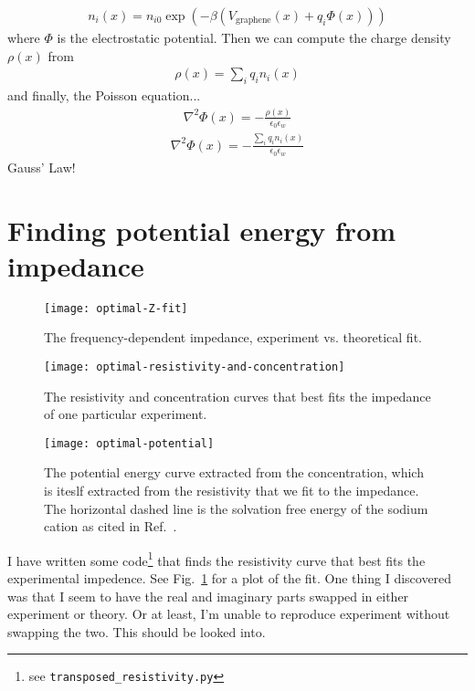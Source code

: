 \documentclass[twocolumn]{revtex4-1}
\begin{document}
\begin{align}
  n_i(x) = n_{i0} \exp\left(-\beta \left(V_{\text{graphene}}(x)
                                       + q_i \Phi(x)\right)\right)
\end{align}
where $\Phi$ is the electrostatic potential.  Then we can compute the
charge density $\rho(x)$ from
\begin{align}
  \rho(x) = \sum_i q_i n_i(x)
\end{align}
and finally, the Poisson equation...
\begin{align}
  \nabla^2 \Phi(x) = -\frac{\rho(x)}{\epsilon_0\epsilon_w}
\end{align}
\begin{align}
  \nabla^2 \Phi(x) = -\frac{\sum_i q_i n_i(x)}{\epsilon_0\epsilon_w}
\end{align}
Gauss' Law!


\clearpage

\section{Finding potential energy from impedance}

\begin{figure}
  \texttt{[image: optimal-Z-fit]}
  \caption{The frequency-dependent impedance, experiment
    vs. theoretical fit.}\label{fig:optimal-Z-fit}
\end{figure}

\begin{figure}
  \texttt{[image: optimal-resistivity-and-concentration]}
  \caption{The resistivity and concentration curves that best fits the
    impedance of one particular
    experiment.}\label{fig:optimal-resistivity-and-concentration}
\end{figure}

\begin{figure}
  \texttt{[image: optimal-potential]}
  \caption{The potential energy curve extracted from the
    concentration, which is iteslf extracted from the resistivity that
    we fit to the impedance.  The horizontal dashed line is the
    solvation free energy of the sodium cation as cited in
    Ref.~\cite{horinek2009rational}.}\label{fig:optimal-potential}
\end{figure}

I have written some code\footnote{see \texttt{transposed\_resistivity.py}} that
finds the resistivity curve that best fits the experimental
impedence.  See Fig.~\ref{fig:optimal-Z-fit} for a plot of the fit.
One thing I discovered was that I seem to have the real and imaginary
parts swapped in either experiment or theory.  Or at least, I'm unable
to reproduce experiment without swapping the two.  This should be
looked into.
\end{document}
